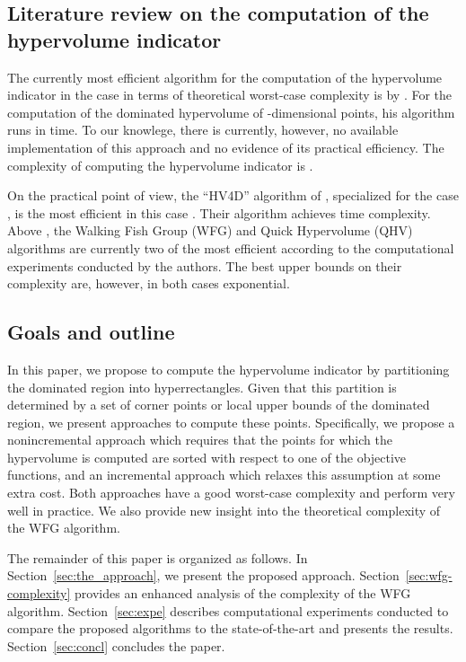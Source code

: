 \documentclass[a4paper,11pt]{article}
\begin{document}
\subsection{Literature review on the computation of the hypervolume indicator}\label{sec:prev_algo}

The currently most efficient algorithm for the computation of the hypervolume indicator in the case 
in terms of theoretical worst-case complexity 
is by \citet{Cha13}.
For the computation of the dominated hypervolume of  -dimensional points,
his algorithm runs in  time. 
To our knowlege, there is currently, however, no available implementation of this approach
and no evidence of its practical efficiency.
The complexity of computing the hypervolume indicator is 
\citep[see][]{BeuFonLopPaqVah09}.

On the practical point of view, the ``HV4D'' algorithm of \citet{GueFonEmm12},
specialized for the case , 
is the most efficient in this case 
\citep[see e.g. the computational results of][]{RusFra14, NowMaeIzz14}.
Their algorithm achieves  time complexity.
Above , the Walking Fish Group (WFG) \citep{WhiBraBar12} 
and Quick Hypervolume (QHV) \citep{RusFra14} algorithms are currently
two of the most efficient according to the computational experiments 
conducted by the authors.
The best upper bounds on their complexity are, however, in both cases exponential.


\subsection{Goals and outline}

In this paper, we propose to compute the hypervolume indicator
by partitioning the dominated region into hyperrectangles. 
Given that this partition is determined by a set of corner points or local upper bounds of the dominated region,
we present approaches to compute these points.
Specifically, we propose a nonincremental approach
which requires that the points for which the hypervolume is computed
are sorted with respect to one of the objective functions,
and an incremental approach which relaxes this assumption
at some extra cost.
Both approaches have a good worst-case complexity and perform very well in practice.
We also provide new insight into the theoretical complexity of the WFG algorithm.

The remainder of this paper is organized as follows.
In Section~\ref{sec:the_approach}, we present the proposed approach.
Section~\ref{sec:wfg-complexity} provides an enhanced analysis
of the complexity of the WFG algorithm.
Section~\ref{sec:expe} describes computational experiments 
conducted to compare the proposed algorithms to the state-of-the-art and presents the results.
Section~\ref{sec:concl} concludes the paper.
\end{document}
